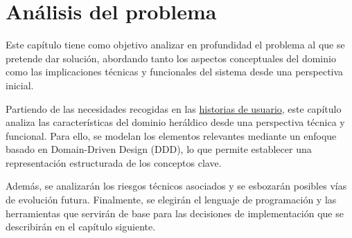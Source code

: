 \chapter{Análisis del problema}
Este capítulo tiene como objetivo analizar en profundidad el problema al que se pretende 
dar solución, abordando tanto los aspectos conceptuales del dominio como las implicaciones 
técnicas y funcionales del sistema desde una perspectiva inicial.

Partiendo de las necesidades recogidas en las \hyperref[sec:historias_usuario]{historias de usuario}, 
este capítulo analiza las características del dominio heráldico desde una perspectiva 
técnica y funcional. Para ello, se modelan los elementos relevantes mediante un enfoque 
basado en Domain-Driven Design (DDD), lo que permite establecer una representación 
estructurada de los conceptos clave.

Además, se analizarán los riesgos técnicos asociados y se esbozarán posibles vías de 
evolución futura. Finalmente, se elegirán el lenguaje de programación y las herramientas
que servirán de base para las decisiones de implementación que se describirán en el capítulo 
siguiente.

